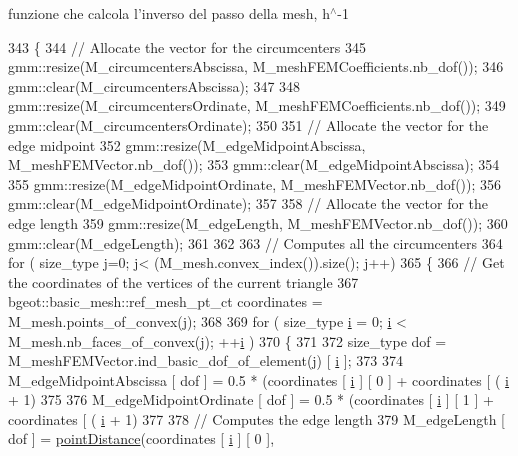 funzione che calcola l'inverso del passo della mesh, h$^\wedge$-\/1 


\begin{DoxyCode}
343 \{
344     \textcolor{comment}{// Allocate the vector for the circumcenters}
345     gmm::resize(M\_circumcentersAbscissa, M\_meshFEMCoefficients.nb\_dof());
346     gmm::clear(M\_circumcentersAbscissa);
347 
348     gmm::resize(M\_circumcentersOrdinate, M\_meshFEMCoefficients.nb\_dof());
349     gmm::clear(M\_circumcentersOrdinate);
350 
351     \textcolor{comment}{// Allocate the vector for the edge midpoint}
352     gmm::resize(M\_edgeMidpointAbscissa, M\_meshFEMVector.nb\_dof());
353     gmm::clear(M\_edgeMidpointAbscissa);
354 
355     gmm::resize(M\_edgeMidpointOrdinate, M\_meshFEMVector.nb\_dof());
356     gmm::clear(M\_edgeMidpointOrdinate);
357 
358     \textcolor{comment}{// Allocate the vector for the edge length}
359     gmm::resize(M\_edgeLength, M\_meshFEMVector.nb\_dof());
360     gmm::clear(M\_edgeLength);
361     
362     
363     \textcolor{comment}{// Computes all the circumcenters}
364     \textcolor{keywordflow}{for} ( size\_type j=0; j< (M\_mesh.convex\_index()).size(); j++)
365     \{   
366         \textcolor{comment}{// Get the coordinates of the vertices of the current triangle}
367         bgeot::basic\_mesh::ref\_mesh\_pt\_ct coordinates = M\_mesh.points\_of\_convex(j);
368 
369         \textcolor{keywordflow}{for} ( size\_type \hyperlink{matrici_8m_a6f6ccfcf58b31cb6412107d9d5281426}{i} = 0; \hyperlink{matrici_8m_a6f6ccfcf58b31cb6412107d9d5281426}{i} < M\_mesh.nb\_faces\_of\_convex(j); ++\hyperlink{matrici_8m_a6f6ccfcf58b31cb6412107d9d5281426}{i} )
370         \{
371             
372             size\_type dof = M\_meshFEMVector.ind\_basic\_dof\_of\_element(j) [ \hyperlink{matrici_8m_a6f6ccfcf58b31cb6412107d9d5281426}{i} ];
373 
374             M\_edgeMidpointAbscissa [ dof ] = 0.5 * (coordinates [ \hyperlink{matrici_8m_a6f6ccfcf58b31cb6412107d9d5281426}{i} ] [ 0 ] + coordinates [ (
      \hyperlink{matrici_8m_a6f6ccfcf58b31cb6412107d9d5281426}{i} + 1) %
375 
376             M\_edgeMidpointOrdinate [ dof ] = 0.5 * (coordinates [ \hyperlink{matrici_8m_a6f6ccfcf58b31cb6412107d9d5281426}{i} ] [ 1 ] + coordinates [ (
      \hyperlink{matrici_8m_a6f6ccfcf58b31cb6412107d9d5281426}{i} + 1) %
377             
378             \textcolor{comment}{// Computes the edge length}
379             M\_edgeLength [ dof ] = \hyperlink{UsefulFunctions_8h_ad9cf8f3fe42287349e8e1b2f1f824958}{pointDistance}(coordinates [ \hyperlink{matrici_8m_a6f6ccfcf58b31cb6412107d9d5281426}{i} ] [ 0 ],

\end{DoxyCode}
